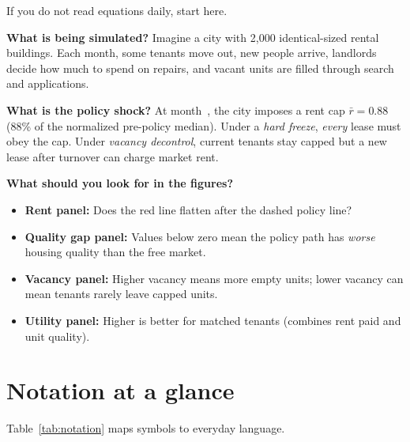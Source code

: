 \documentclass[11pt,a4paper]{article}
\begin{document}
If you do not read equations daily, start here.

\begin{framed}
\textbf{What is being simulated?} Imagine a city with 2{,}000 identical-sized rental buildings. Each month, some tenants move out, new people arrive, landlords decide how much to spend on repairs, and vacant units are filled through search and applications.

\textbf{What is the policy shock?} At month~\SimPolicyStart{}, the city imposes a rent cap $\bar r=0.88$ (88\% of the normalized pre-policy median). Under a \emph{hard freeze}, \emph{every} lease must obey the cap. Under \emph{vacancy decontrol}, current tenants stay capped but a new lease after turnover can charge market rent.

\textbf{What should you look for in the figures?}
\begin{itemize}
    \item \textbf{Rent panel:} Does the red line flatten after the dashed policy line?
    \item \textbf{Quality gap panel:} Values below zero mean the policy path has \emph{worse} housing quality than the free market.
    \item \textbf{Vacancy panel:} Higher vacancy means more empty units; lower vacancy can mean tenants rarely leave capped units.
    \item \textbf{Utility panel:} Higher is better for matched tenants (combines rent paid and unit quality).
\end{itemize}
\end{framed}

\section{Notation at a glance}

Table~\ref{tab:notation} maps symbols to everyday language.
\end{document}
